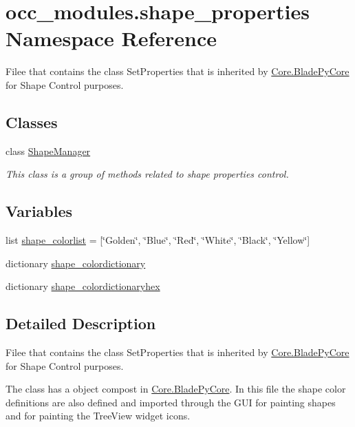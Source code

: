 \hypertarget{a00056}{}\section{occ\+\_\+modules.\+shape\+\_\+properties Namespace Reference}
\label{a00056}


Filee that contains the class Set\+Properties that is inherited by \hyperlink{a00078}{Core.\+Blade\+Py\+Core} for Shape Control purposes.  


\subsection*{Classes}
\begin{DoxyCompactItemize}
\item 
class \hyperlink{a00094}{Shape\+Manager}
\begin{DoxyCompactList}\small\item\em This class is a group of methods related to shape properties control. \end{DoxyCompactList}\end{DoxyCompactItemize}
\subsection*{Variables}
\begin{DoxyCompactItemize}
\item 
list \hyperlink{a00056_ad2dbba5d4e06c2ef16d74722e24325bb}{shape\+\_\+colorlist} = \mbox{[}\char`\"{}Golden\char`\"{}, \char`\"{}Blue\char`\"{}, \char`\"{}Red\char`\"{}, \char`\"{}White\char`\"{}, \char`\"{}Black\char`\"{}, \char`\"{}Yellow\char`\"{}\mbox{]}
\item 
dictionary \hyperlink{a00056_a2435b9798b2353ff84c79fe909cc39fd}{shape\+\_\+colordictionary}
\item 
dictionary \hyperlink{a00056_a8deb972f03c3f2b89ddc04b0006dd0b2}{shape\+\_\+colordictionaryhex}
\end{DoxyCompactItemize}


\subsection{Detailed Description}
Filee that contains the class Set\+Properties that is inherited by \hyperlink{a00078}{Core.\+Blade\+Py\+Core} for Shape Control purposes. 

The class has a object compost in \hyperlink{a00078}{Core.\+Blade\+Py\+Core}. In this file the shape color definitions are also defined and imported through the G\+UI for painting shapes and for painting the Tree\+View widget icons. 

